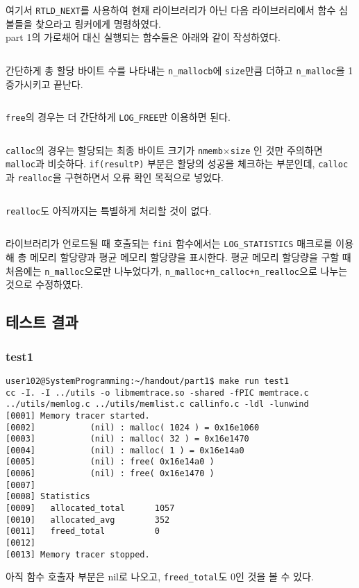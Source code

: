 \documentclass{report}
\begin{document}
\inputminted[firstline=86,lastline=105, linenos]{C}{2019-13674.224747/part1/memtrace.c}
여기서 \lstinline{RTLD_NEXT}를 사용하여 현재 라이브러리가 아닌 다음 라이브러리에서 함수 심볼들을 찾으라고 링커에게 명령하였다.
\\
part 1의 가로채어 대신 실행되는 함수들은 아래와 같이 작성하였다. 
\inputminted[firstline=35,lastline=42, linenos]{C}{2019-13674.224747/part1/memtrace.c}
간단하게 총 할당 바이트 수를 나타내는 \lstinline{n_mallocb}에 \lstinline{size}만큼 더하고 \lstinline{n_malloc}을 1 증가시키고 끝난다.
\inputminted[firstline=44,lastline=48, linenos]{C}{2019-13674.224747/part1/memtrace.c}
\lstinline{free}의 경우는 더 간단하게 \lstinline{LOG_FREE}만 이용하면 된다.
\inputminted[firstline=50,lastline=59, linenos]{C}{2019-13674.224747/part1/memtrace.c}
\lstinline{calloc}의 경우는 할당되는 최종 바이트 크기가 \lstinline{nmemb}$\times$\lstinline{size} 인 것만 주의하면 \lstinline{malloc}과 비슷하다. \lstinline{if(resultP)} 부분은 할당의 성공을 체크하는 부분인데, \lstinline{calloc}과 \lstinline{realloc}을 구현하면서 오류 확인 목적으로 넣었다.
\inputminted[firstline=60,lastline=69, linenos]{C}{2019-13674.224747/part1/memtrace.c}
\lstinline{realloc}도 아직까지는 특별하게 처리할 것이 없다.

\inputminted[firstline=113,lastline=124, linenos]{C}{2019-13674.224747/part1/memtrace.c}
라이브러리가 언로드될 때 호출되는 \lstinline{fini} 함수에서는 \lstinline{LOG_STATISTICS} 매크로를 이용해 총 메모리 할당량과 평균 메모리 할당량을 표시한다. 평균 메모리 할당량을 구할 때 처음에는 \lstinline{n_malloc}으로만 나누었다가, \lstinline{n_malloc+n_calloc+n_realloc}으로 나누는 것으로 수정하였다.

\subsection{테스트 결과}
\subsubsection{test1}
\begin{verbatim}
user102@SystemProgramming:~/handout/part1$ make run test1
cc -I. -I ../utils -o libmemtrace.so -shared -fPIC memtrace.c ../utils/memlog.c ../utils/memlist.c callinfo.c -ldl -lunwind
[0001] Memory tracer started.
[0002]           (nil) : malloc( 1024 ) = 0x16e1060
[0003]           (nil) : malloc( 32 ) = 0x16e1470
[0004]           (nil) : malloc( 1 ) = 0x16e14a0
[0005]           (nil) : free( 0x16e14a0 )
[0006]           (nil) : free( 0x16e1470 )
[0007]
[0008] Statistics
[0009]   allocated_total      1057
[0010]   allocated_avg        352
[0011]   freed_total          0
[0012]
[0013] Memory tracer stopped.
\end{verbatim}
아직 함수 호출자 부분은 nil로 나오고, \lstinline{freed_total}도 0인 것을 볼 수 있다.
\end{document}
